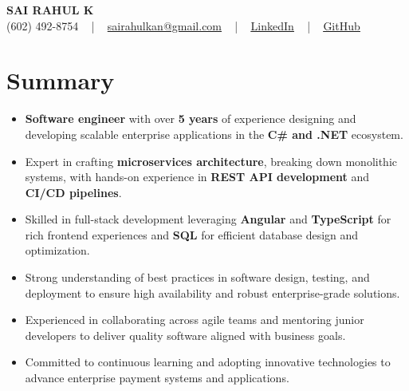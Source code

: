 \documentclass[letterpaper,11pt]{article}
\newcommand{\resumeItem}[1]{
  \item\footnotesize{
    {#1 \vspace{-2pt}}
  }
}
\newcommand{\resumeItemListStart}{\begin{itemize}[leftmargin=*]}
\newcommand{\resumeItemListEnd}{\end{itemize}\vspace{-5pt}}
\begin{document}
\begin{center}
    {\fontsize{14pt}{12pt}\selectfont \textbf{\MakeUppercase{Sai Rahul K}}}\\ \vspace{2pt}
    \fontsize{10pt}{12pt}\selectfont (602) 492-8754 ~ | ~ \href{mailto:sairahulkan@gmail.com}{sairahulkan@gmail.com} ~ | ~
    \href{https://www.linkedin.com/in/rq123/}{\color{blue}\underline{LinkedIn}} ~ | ~
    \href{https://github.com/kanrahuldo}{\color{blue}\underline{GitHub}}~
    \vspace{-8pt}
\end{center}

\section{Summary}
\fontsize{9pt}{10pt}\selectfont
\resumeItemListStart
    \resumeItem{\textbf{Software engineer} with over \textbf{5 years} of experience designing and developing scalable enterprise applications in the \textbf{C\# and .NET} ecosystem.} \vspace{-3pt}
    \resumeItem{Expert in crafting \textbf{microservices architecture}, breaking down monolithic systems, with hands-on experience in \textbf{REST API development} and \textbf{CI/CD pipelines}.} \vspace{-3pt}
    \resumeItem{Skilled in full-stack development leveraging \textbf{Angular} and \textbf{TypeScript} for rich frontend experiences and \textbf{SQL} for efficient database design and optimization.} \vspace{-3pt}
    \resumeItem{Strong understanding of best practices in software design, testing, and deployment to ensure high availability and robust enterprise-grade solutions.} \vspace{-3pt}
    \resumeItem{Experienced in collaborating across agile teams and mentoring junior developers to deliver quality software aligned with business goals.} \vspace{-3pt}
    \resumeItem{Committed to continuous learning and adopting innovative technologies to advance enterprise payment systems and applications.} \vspace{-3pt}
\resumeItemListEnd
\vspace{-6pt}
\end{document}
